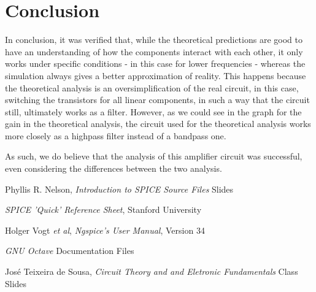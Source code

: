 \clearpage
\section{Conclusion}
\label{sec:conclusion}

In conclusion, it was verified that, while the theoretical predictions are good to have an understanding of how the components interact with each other, it only works under specific conditions - in this case for lower frequencies - whereas the simulation always gives a better approximation of reality. This happens because the theoretical analysis is an oversimplification of the real circuit, in this case, switching the transistors for all linear components, in such a way that the circuit still, ultimately works as a filter. However, as we could see in the graph for the gain in the theoretical analysis, the circuit used for the theoretical analysis works more closely as a highpass filter instead of a bandpass one.

As such, we do believe that the analysis of this amplifier circuit was successful, even considering the differences between the two analysis.

\begin{thebibliography}{}

Phyllis R. Nelson, \emph{Introduction to SPICE Source Files} Slides

\emph{SPICE 'Quick' Reference Sheet}, Stanford University

Holger Vogt \textit{et al}, \emph{Ngspice's User Manual}, Version 34

\emph{GNU Octave} Documentation Files 

José Teixeira de Sousa, \emph{Circuit Theory and and Eletronic Fundamentals} Class Slides

\end{thebibliography}